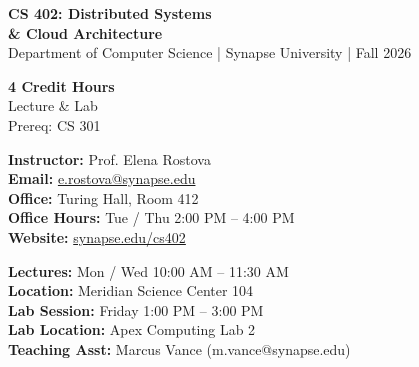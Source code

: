 \documentclass[11pt, a4paper]{article}
\begin{document}
\begin{tcolorbox}[coursebox]
  \begin{minipage}[c]{0.68\textwidth}
    {\color{NavyPrimary}\sffamily\Huge\bfseries CS 402: Distributed Systems} \\[4pt]
    {\color{TealSecondary}\sffamily\Large\bfseries \& Cloud Architecture} \\[6pt]
    {\color{TextDark}\sffamily\small Department of Computer Science | Synapse University | Fall 2026}
  \end{minipage}%
  \hfill
  \begin{minipage}[c]{0.28\textwidth}
    \raggedleft
    \begin{tcolorbox}[infobox]
      \centering
      {\color{NavyPrimary}\sffamily\bfseries\small 4 Credit Hours} \\[2pt]
      {\color{TextDark}\small Lecture \& Lab} \\[2pt]
      {\color{TextMuted}\footnotesize Prereq: CS 301}
    \end{tcolorbox}
  \end{minipage}
\end{tcolorbox}

\vspace{0.5em}

\noindent
\begin{minipage}[t]{0.48\textwidth}
  \begin{tcolorbox}[title={\sffamily\bfseries \faUserGraduate\ Instructor Information}, colback=white, colframe=NavyPrimary, coltitle=white, arc=3pt, boxrule=0.8pt]
    \small
    \textbf{Instructor:} Prof. Elena Rostova \\{}
    \textbf{Email:} \href{mailto:e.rostova@synapse.edu}{e.rostova@synapse.edu} \\{}
    \textbf{Office:} Turing Hall, Room 412 \\{}
    \textbf{Office Hours:} Tue / Thu 2:00 PM -- 4:00 PM \\{}
    \textbf{Website:} \href{https://synapse.edu/cs402}{synapse.edu/cs402}
  \end{tcolorbox}
\end{minipage}%
\hfill
\begin{minipage}[t]{0.48\textwidth}
  \begin{tcolorbox}[title={\sffamily\bfseries \faClock\ Course Logistics}, colback=white, colframe=TealSecondary, coltitle=white, arc=3pt, boxrule=0.8pt]
    \small
    \textbf{Lectures:} Mon / Wed 10:00 AM -- 11:30 AM \\{}
    \textbf{Location:} Meridian Science Center 104 \\{}
    \textbf{Lab Session:} Friday 1:00 PM -- 3:00 PM \\{}
    \textbf{Lab Location:} Apex Computing Lab 2 \\{}
    \textbf{Teaching Asst:} Marcus Vance (m.vance@synapse.edu)
  \end{tcolorbox}
\end{minipage}
\end{document}
